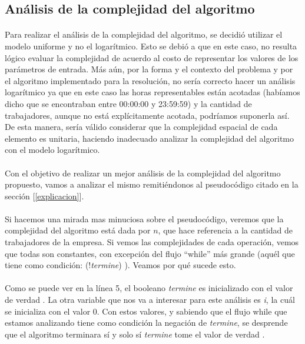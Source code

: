 \subsection{Análisis de la complejidad del algoritmo}

\paragraph{}
Para realizar el análisis de la complejidad del algoritmo, se decidió utilizar el modelo uniforme y no el logarítmico. Esto se debió a que en este caso, no resulta lógico evaluar la complejidad de acuerdo al costo de representar los valores de los parámetros de entrada. Más aún, por la forma y el contexto del problema y por el algoritmo implementado para la resolución, no sería correcto hacer un análisis logarítmico ya que en este caso las horas representables están acotadas (habíamos dicho que se encontraban entre 00:00:00 y 23:59:59) y la cantidad de trabajadores, aunque no está explícitamente acotada, podríamos suponerla así. De esta manera, sería válido considerar que la complejidad espacial de cada elemento es unitaria, haciendo inadecuado analizar la complejidad del algoritmo con el modelo logarítmico.

\paragraph{}
Con el objetivo de realizar un mejor análisis de la complejidad del algoritmo propuesto, vamos a analizar el mismo remitiéndonos al pseudocódigo citado en la sección [\ref{explicacion}].

\paragraph{}
Si hacemos una mirada mas minuciosa sobre el pseudocódigo, veremos que la complejidad del algoritmo está dada por $n$, que hace referencia a la cantidad de trabajadores de la empresa. Si vemos las complejidades de cada operación, vemos que todas son constantes, con excepción del flujo ``while'' más grande (aquél que tiene como condición: (!\textit{termine}) ). Veamos por qué sucede esto.

\paragraph{}
Como se puede ver en la línea 5, el booleano \textit{termine} es inicializado con el valor de verdad \false. La otra variable que nos va a interesar para este análisis es \textit{i}, la cuál se inicializa con el valor 0. Con estos valores, y sabiendo que el flujo while que estamos analizando tiene como condición la negación de \textit{termine}, se desprende que el algoritmo terminara sí y solo sí \textit{termine} tome el valor de verdad \true .

